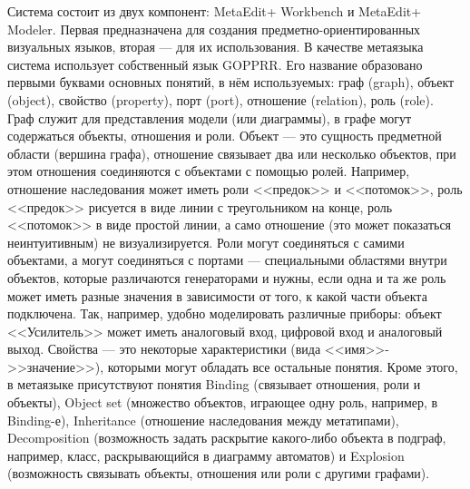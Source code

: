Система состоит из двух компонент: MetaEdit+ Workbench и MetaEdit+ Modeler. Первая 
предназначена для создания предметно-ориентированных визуальных языков, вторая --- для 
их использования. В качестве метаязыка система использует собственный язык GOPPRR. 
Его название образовано первыми буквами основных понятий, в нём используемых: граф (graph), 
объект (object), свойство (property), порт (port), отношение (relation), роль (role). 
Граф служит для представления модели (или диаграммы), в графе могут содержаться объекты, 
отношения и роли. Объект --- это сущность предметной области (вершина графа), отношение 
связывает два или несколько объектов, при этом отношения соединяются с объектами с помощью ролей. 
Например, отношение наследования может иметь роли <<предок>> и <<потомок>>, роль <<предок>> 
рисуется в виде линии с треугольником на конце, роль <<потомок>> в виде простой линии, 
а само отношение (это может показаться неинтуитивным) не визуализируется. Роли могут 
соединяться с самими объектами, а могут соединяться с портами --- специальными областями 
внутри объектов, которые различаются генераторами и нужны, если одна и та же роль может 
иметь разные значения в зависимости от того, к какой части объекта подключена. Так, 
например, удобно моделировать различные приборы: объект <<Усилитель>> может иметь аналоговый 
вход, цифровой вход и аналоговый выход. Свойства --- это некоторые характеристики 
(вида <<имя>>->>значение>>), которыми могут обладать все остальные понятия. Кроме 
этого, в метаязыке присутствуют понятия Binding (связывает отношения, роли и объекты),
Object set (множество объектов, играющее одну роль, например, в Binding-е), Inheritance 
(отношение наследования между метатипами), Decomposition (возможность задать раскрытие 
какого-либо объекта в подграф, например, класс, раскрывающийся в диаграмму автоматов) и 
Explosion (возможность связывать объекты, отношения или роли с другими графами).

